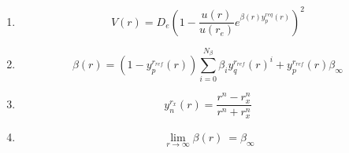 \documentclass{article}
\begin{document}
\begin{enumerate}

\item \begin{equation} V(r)=D_e(1-\frac{u(r)}{u(r_e)}e^{\beta(r)y_p^{req}(r)})^2 \end{equation}

\item \begin{equation} \beta(r)=(1-y_p^{r_{ref}}(r))\sum_{i=0}^{N_\beta}\beta_iy_q^{r_{ref}}(r)^i+y_p^{r_{ref}}(r)\beta_\infty\end{equation}

\item \begin{equation} y_n^{r_x}(r)=\frac{r^n-r_x^n}{r^n+r_x^n} \end{equation}

\item \begin{equation} \ \lim_{r\to\infty} \beta(r) \ = \beta_\infty \end{equation}

\end{enumerate}
\end{document}
